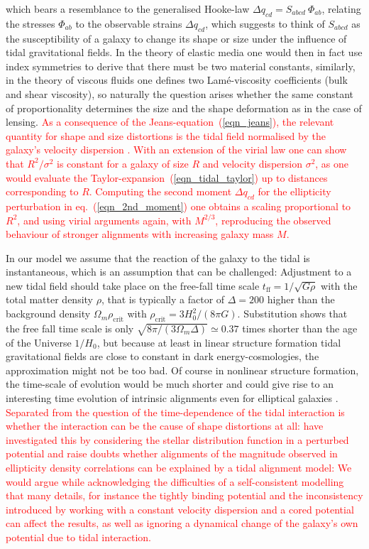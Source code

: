 \documentclass[a4paper,fleqn,usenatbib]{mnras}
\newcommand\spirou[1]{\textcolor{red}{#1}}
\begin{document}
which bears a resemblance to the generalised Hooke-law $\Delta q_{cd} = S_{abcd}\:\Phi_{ab}$, relating the stresses $\Phi_{ab}$ to the observable strains $\Delta q_{cd}$, which suggests to think of $S_{abcd}$ as the susceptibility of a galaxy to change its shape or size under the influence of tidal gravitational fields. In the theory of elastic media one would then in fact use index symmetries to derive that there must be two material constants, similarly, in the theory of viscous fluids one defines two Lam{\'e}-viscosity coefficients (bulk and shear viscosity), so naturally the question arises whether the same constant of proportionality determines the size and the shape deformation as in the case of lensing. \spirou{As a consequence of the Jeans-equation~(\ref{eqn_jeans}), the relevant quantity for shape and size distortions is the tidal field normalised by the galaxy's velocity dispersion \citet{camelio_origin_2015,piras_mass_2018}. With an extension of the virial law one can show that $R^2/\sigma^2$ is constant for a galaxy of size $R$ and velocity dispersion $\sigma^2$, as one would evaluate the Taylor-expansion~(\ref{eqn_tidal_taylor}) up to distances corresponding to $R$. Computing the second moment $\Delta q_{cd}$ for the ellipticity perturbation in eq.~(\ref{eqn_2nd_moment}) one obtains a scaling proportional to $R^2$, and using virial arguments again, with $M^{2/3}$, reproducing the observed behaviour of stronger alignments with increasing galaxy mass $M$.}

In our model we assume that the reaction of the galaxy to the tidal is instantaneous, which is an assumption that can be challenged: Adjustment to a new tidal field should take place on the free-fall time scale $t_\mathrm{ff} = 1/\sqrt{G\rho}$ with the total matter density $\rho$, that is typically a factor of $\Delta = 200$ higher than the background density $\Omega_m\rho_\mathrm{crit}$ with $\rho_\mathrm{crit} = 3H_0^2/(8\pi G)$. Substitution shows that the free fall time scale is only $\sqrt{8\pi/(3\Omega_m\Delta)}\simeq 0.37$ times shorter than the age of the Universe $1/H_0$, but because at least in linear structure formation tidal gravitational fields are close to constant in dark energy-cosmologies, the approximation might not be too bad. Of course in nonlinear structure formation, the time-scale of evolution would be much shorter and could give rise to an interesting time evolution of intrinsic alignments even for elliptical galaxies \citep{lee_nonlinear_2007, schafer_galactic_2012, schmitz_time_2018}. \spirou{Separated from the question of the time-dependence of the tidal interaction is whether the interaction can be the cause of shape distortions at all: \citep{camelio_origin_2015} have investigated this by considering the stellar distribution function in a perturbed potential and raise doubts whether alignments of the magnitude observed in ellipticity density correlations can be explained by a tidal alignment model: We would argue while acknowledging the difficulties of a self-consistent modelling that many details, for instance the tightly binding potential and the inconsistency introduced by working with a constant velocity dispersion and a cored potential can affect the results, as well as ignoring a dynamical change of the galaxy's own potential due to tidal interaction.}
\end{document}

